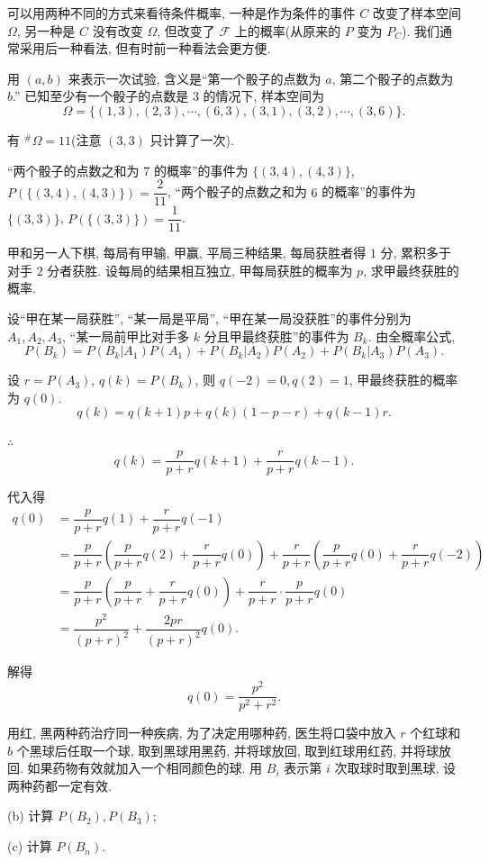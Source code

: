 \documentclass[color=black,device=normal,lang=cn]{elegantnote}
\numberwithin{equation}{section}
\theoremstyle{plain}
\numberwithin{exercise}{exsection}
\begin{document}
可以用两种不同的方式来看待条件概率, 一种是作为条件的事件 $C$ 改变了样本空间 $\Omega$, 另一种是 $C$ 没有改变 $\Omega$, 但改变了 $\mathcal{F}$ 上的概率(从原来的 $P$ 变为 $P_C$). 我们通常采用后一种看法, 但有时前一种看法会更方便.
\begin{solution}[另一种解法]
    用 $(a,b)$ 来表示一次试验, 含义是``第一个骰子的点数为 $a$, 第二个骰子的点数为 $b$.'' 已知至少有一个骰子的点数是 $3$ 的情况下, 样本空间为
    \[\Omega=\{(1,3),(2,3),\cdots,(6,3),(3,1),(3,2),\cdots,(3,6)\}.\]

    有 $^\#\Omega=11$(注意 $(3,3)$ 只计算了一次).

    ``两个骰子的点数之和为 $7$ 的概率''的事件为 $\{(3,4),(4,3)\}$, $P(\{(3,4),(4,3)\})=\dfrac{2}{11}$, ``两个骰子的点数之和为 $6$ 的概率''的事件为 $\{(3,3)\}$, $P(\{(3,3)\})=\dfrac{1}{11}$.
\end{solution}
\addtocounter{exercise}{6}
\begin{exercise}%
    甲和另一人下棋, 每局有甲输, 甲赢, 平局三种结果, 每局获胜者得 $1$ 分, 累积多于对手 $2$ 分者获胜. 设每局的结果相互独立, 甲每局获胜的概率为 $p$, 求甲最终获胜的概率.
\end{exercise}
\begin{solution}
    设``甲在某一局获胜'', ``某一局是平局'', ``甲在某一局没获胜''的事件分别为 $A_1,A_2,A_3$, ``某一局前甲比对手多 $k$ 分且甲最终获胜''的事件为 $B_k$. 由全概率公式,
    \[P(B_k)=P(B_k|A_1)P(A_1)+P(B_k|A_2)P(A_2)+P(B_k|A_3)P(A_3).\]

    设 $r=P(A_3)$, $q(k)=P(B_k)$, 则 $q(-2)=0,q(2)=1$, 甲最终获胜的概率为 $q(0)$.
    \[q(k)=q(k+1)p+q(k)(1-p-r)+q(k-1)r.\]

    $\therefore$
    \[q(k)=\dfrac{p}{p+r}q(k+1)+\dfrac{r}{p+r}q(k-1).\]

    代入得
    \begin{align*}
        q(0) & =\dfrac{p}{p+r}q(1)+\dfrac{r}{p+r}q(-1) \\
        & =\dfrac{p}{p+r}\left(\dfrac{p}{p+r}q(2)+\dfrac{r}{p+r}q(0)\right)+\dfrac{r}{p+r}\left(\dfrac{p}{p+r}q(0)+\dfrac{r}{p+r}q(-2)\right) \\
        & =\dfrac{p}{p+r}\left(\dfrac{p}{p+r}+\dfrac{r}{p+r}q(0)\right)+\dfrac{r}{p+r}\cdot\dfrac{p}{p+r}q(0) \\
        & =\dfrac{p^2}{(p+r)^2}+\dfrac{2pr}{(p+r)^2}q(0).
    \end{align*}

    解得
    \[q(0)=\dfrac{p^2}{p^2+r^2}.\]
\end{solution}
\begin{exercise}%
    用红, 黑两种药治疗同一种疾病, 为了决定用哪种药, 医生将口袋中放入 $r$ 个红球和 $b$ 个黑球后任取一个球, 取到黑球用黑药, 并将球放回, 取到红球用红药, 并将球放回. 如果药物有效就加入一个相同颜色的球. 用 $B_i$ 表示第 $i$ 次取球时取到黑球, 设两种药都一定有效.

    (b) 计算 $P(B_2),P(B_3)$;

    (c) 计算 $P(B_n)$.
\end{exercise}
\end{document}
